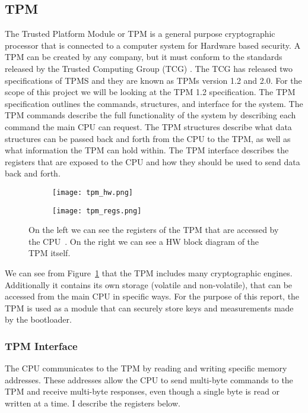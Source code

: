 \documentclass[../report.tex]{subfiles}
\begin{document}
\subsection{TPM}

The Trusted Platform Module\cite{TPM} or TPM is a general purpose cryptographic processor that is connected to a computer system for Hardware based security.
A TPM can be created by any company, but it must conform to the standards released by the Trusted Computing Group (TCG) \cite{TCG}.
The TCG has released two specifications of TPMS and they are known as TPMs version 1.2 and 2.0.
For the scope of this project we will be looking at the TPM 1.2 specification.
The TPM specification outlines the commands, structures, and interface for the system.
The TPM commands describe the full functionality of the system by describing each command the main CPU can request.
The TPM structures describe what data structures can be passed back and forth from the CPU to the TPM, as well as what information the TPM can hold within.
The TPM interface describes the registers that are exposed to the CPU and how they should be used to send data back and forth.

\begin{figure}
  \centering
\begin{subfigure}{.4\textwidth}
  \centering
  \texttt{[image: tpm\_hw.png]}
\end{subfigure}
\begin{subfigure}{.40\textwidth}
  \centering
  \texttt{[image: tpm\_regs.png]}
\end{subfigure}
\caption{On the left we can see the registers of the TPM that are accessed by the CPU~. On the right we can see a HW block diagram of the TPM itself\cite{tpm-slides}.}
\label{fig:tpm_hw}
\end{figure}

We can see from Figure~\ref{fig:tpm_hw} that the TPM includes many cryptographic engines. 
Additionally it contains its own storage (volatile and non-volatile), that can be accessed from the main CPU in specific ways.
For the purpose of this report, the TPM is used as a module that can securely store keys and measurements made by the bootloader.

\subsubsection{TPM Interface}

The CPU communicates to the TPM by reading and writing specific memory addresses.
These addresses allow the CPU to send multi-byte commands to the TPM and receive multi-byte responses, even though a single byte is read or written at a time.
I describe the registers below.
\end{document}
